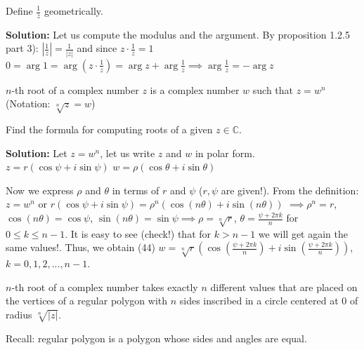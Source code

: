 \documentclass[12pt]{article}
\begin{document}
\begin{example}
Define $\frac{1}{z}$ geometrically.

\textbf{Solution:} Let us compute the modulus and the argument.
By proposition 1.2.5 part 3): $|\frac{1}{z}| = \frac{1}{|z|}$ and since $z\cdot \frac{1}{z} = 1$
$0 = \arg 1 = \arg(z\cdot \frac{1}{z}) = \arg z + \arg \frac{1}{z} \implies \arg \frac{1}{z} = -\arg z$
\end{example}

\begin{definition}
$n$-th root of a complex number $z$ is a complex number $w$ such that $z = w^n$ (Notation: $\sqrt[n]{z} = w$)
\end{definition}

\begin{example}
Find the formula for computing roots of a given $z \in \mathbb{C}$.

\textbf{Solution:} Let $z=w^n$, let us write $z$ and $w$ in polar form.
$z = r(\cos\psi + i\sin\psi)$
$w = \rho(\cos\theta + i\sin\theta)$

Now we express $\rho$ and $\theta$ in terms of $r$ and $\psi$ ($r, \psi$ are given!).
From the definition: $z=w^n$ or $r(\cos\psi + i\sin\psi) = \rho^n(\cos(n\theta) + i\sin(n\theta))$
$\implies \rho^n = r$, $\cos(n\theta) = \cos\psi$, $\sin(n\theta) = \sin\psi \implies \rho = \sqrt[n]{r}$, $\theta = \frac{\psi + 2\pi k}{n}$ for $0\leq k \leq n-1$.
It is easy to see (check!) that for $k>n-1$ we will get again the same values!. Thus, we obtain
(44) $w = \sqrt[n]{r}(\cos(\frac{\psi + 2\pi k}{n}) + i\sin(\frac{\psi + 2\pi k}{n}))$, $k=0,1,2,...,n-1$.
\end{example}

\begin{corollary}
$n$-th root of a complex number takes exactly $n$ different values that are placed on the vertices of a regular polygon with $n$ sides inscribed in a circle centered at 0 of radius $\sqrt[n]{|z|}$.
\end{corollary}

Recall: regular polygon is a polygon whose sides and angles are equal.
\end{document}
